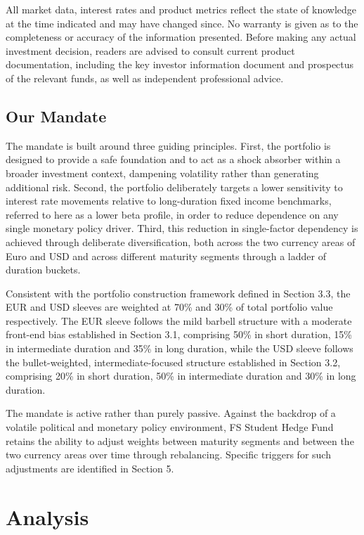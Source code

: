 \documentclass[11pt,a4paper]{article}
\begin{document}
All market data, interest rates and product metrics reflect the state of knowledge at the time indicated and may have changed since. No warranty is given as to the completeness or accuracy of the information presented. Before making any actual investment decision, readers are advised to consult current product documentation, including the key investor information document and prospectus of the relevant funds, as well as independent professional advice.

\subsection{Our Mandate}

The mandate is built around three guiding principles. First, the portfolio is designed to provide a safe foundation and to act as a shock absorber within a broader investment context, dampening volatility rather than generating additional risk. Second, the portfolio deliberately targets a lower sensitivity to interest rate movements relative to long-duration fixed income benchmarks, referred to here as a lower beta profile, in order to reduce dependence on any single monetary policy driver. Third, this reduction in single-factor dependency is achieved through deliberate diversification, both across the two currency areas of Euro and USD and across different maturity segments through a ladder of duration buckets.

Consistent with the portfolio construction framework defined in Section 3.3, the EUR and USD sleeves are weighted at 70\% and 30\% of total portfolio value respectively. The EUR sleeve follows the mild barbell structure with a moderate front-end bias established in Section 3.1, comprising 50\% in short duration, 15\% in intermediate duration and 35\% in long duration, while the USD sleeve follows the bullet-weighted, intermediate-focused structure established in Section 3.2, comprising 20\% in short duration, 50\% in intermediate duration and 30\% in long duration.

The mandate is active rather than purely passive. Against the backdrop of a volatile political and monetary policy environment, FS Student Hedge Fund retains the ability to adjust weights between maturity segments and between the two currency areas over time through rebalancing. Specific triggers for such adjustments are identified in Section 5.

\section{Analysis}
\end{document}
